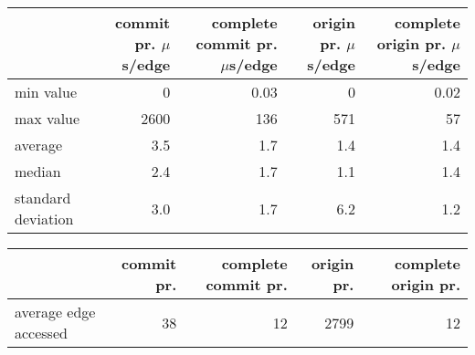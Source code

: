 \documentclass[11pt,a4paper]{article}
\begin{document}
\begin{center}
    \begin{tabular}{@{} l *4r @{}}
        \toprule
        \multicolumn{1}{c}{} &
            \thead{\normalsize{\textbf{commit pr.}} \\ $\mu$s/edge} &
            \thead{\normalsize{\textbf{complete commit pr.}} \\ $\mu$s/edge} &
            \thead{\normalsize{\textbf{origin pr.}} \\ $\mu$s/edge} &
            \thead{\normalsize{\textbf{complete origin pr.}} \\ $\mu$s/edge} \\
        \midrule
        min value & 0 & 0.03 & 0 & 0.02 \\
        max value & 2600 & 136 & 571 & 57 \\
        average & 3.5 & 1.7 & 1.4 & 1.4 \\
        median & 2.4 & 1.7 & 1.1 & 1.4 \\
        standard deviation & 3.0 & 1.7 & 6.2 & 1.2 \\
        \bottomrule
    \end{tabular}
\end{center}

\vspace{0.5cm}

\begin{center}
    \begin{tabular}{@{} l *4r @{}}
        \toprule
        \multicolumn{1}{c}{} &
            \textbf{commit pr.} &
            \textbf{complete commit pr.} &
            \textbf{origin pr.} &
            \textbf{complete origin pr.} \\
        \midrule
        average edge accessed & 38 & 12 & 2799 & 12 \\
        \bottomrule
    \end{tabular}
\end{center}
\end{document}
